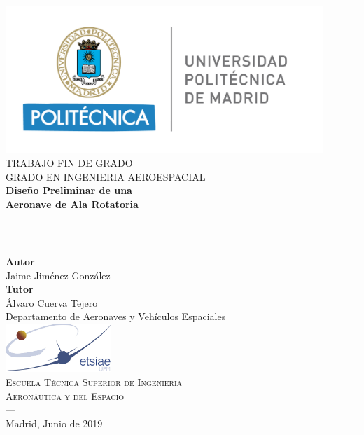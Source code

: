 \begin{titlepage}
\newlength{\centeroffset}
\setlength{\centeroffset}{-0.5\oddsidemargin}
\addtolength{\centeroffset}{0.5\evensidemargin}
\thispagestyle{empty}

\noindent\hspace*{\centeroffset}\begin{minipage}{\textwidth}

\centering
\includegraphics[width=0.9\textwidth]{imagenes/logo_UPM.png}\\[1.4cm]

\textsc{ \Large TRABAJO FIN DE GRADO\\[0.2cm]}
\textsc{ GRADO EN INGENIERIA AEROESPACIAL}\\[1cm]

{\Huge\bfseries Diseño Preliminar de una \\[0.2cm]
Aeronave de Ala Rotatoria}
\noindent\rule[-1ex]{\textwidth}{3pt}\\[3.5ex]
\end{minipage}

\vspace{2.5cm}
\noindent\hspace*{\centeroffset}
\begin{minipage}{\textwidth}
\centering

\textbf{Autor}\\ {Jaime Jiménez González}\\
\textbf{Tutor}\\ {Álvaro Cuerva Tejero}\\ {Departamento de Aeronaves y Vehículos Espaciales}\\[0.5cm]
\includegraphics[width=0.3\textwidth]{imagenes/logo_ETSIAE.jpg}\\[0.1cm]
\textsc{Escuela Técnica Superior de Ingeniería \\
	Aeronáutica y del Espacio}\\
\textsc{---}\\
Madrid, Junio de 2019
\end{minipage}
\end{titlepage}
